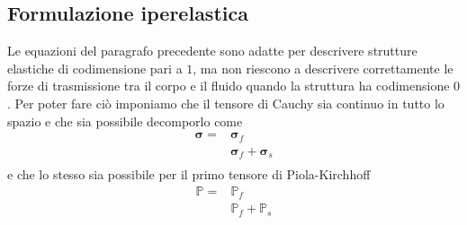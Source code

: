 \subsection{Formulazione iperelastica}
Le equazioni del paragrafo precedente sono adatte per descrivere strutture elastiche di codimensione pari a $1$, ma non riescono a descrivere correttamente le forze di trasmissione tra il corpo e il fluido quando la struttura ha codimensione $0$. Per poter fare ciò imponiamo che il tensore di Cauchy sia continuo in tutto lo spazio e che sia possibile decomporlo come
\begin{equation}
\begin{aligned}
\boldsymbol{\sigma} = &\boldsymbol{\sigma}_f\\
                    &\boldsymbol{\sigma}_f + \boldsymbol{\sigma}_s\\
\end{aligned}
\end{equation}
e che lo stesso sia possibile per il primo tensore di Piola-Kirchhoff
\begin{equation}
\begin{aligned}
\mathbb{P} = &\mathbb{P}_f\\
                    &\mathbb{P}_f + \mathbb{P}_s\\
\end{aligned}
\end{equation}

